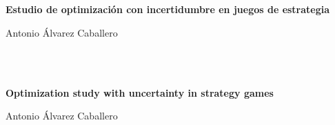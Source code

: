 \chapter*{}


% 



\cleardoublepage
\thispagestyle{empty}

\begin{center}
{\large\bfseries Estudio de optimización con incertidumbre en juegos de estrategia}\\
\end{center}
\begin{center}
Antonio Álvarez Caballero \\
\end{center}

\\

\vspace{0.7cm}
\\


\cleardoublepage


\thispagestyle{empty}


\begin{center}
{\large\bfseries Optimization study with uncertainty in strategy games}\\
\end{center}
\begin{center}
Antonio Álvarez Caballero \\
\end{center}

\\

\vspace{0.7cm}
\\



\chapter*{}
\thispagestyle{empty}

